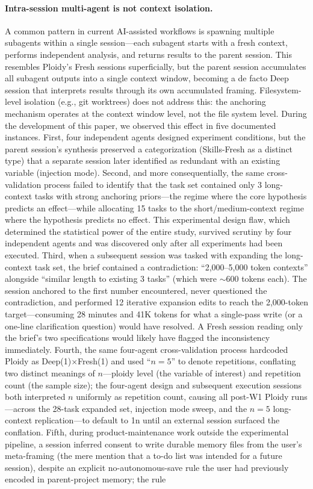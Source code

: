 \documentclass[11pt]{article}
\begin{document}
\paragraph{Intra-session multi-agent is not context isolation.}
A common pattern in current AI-assisted workflows is spawning multiple subagents within a single session---each subagent starts with a fresh context, performs independent analysis, and returns results to the parent session. This resembles Ploidy's Fresh sessions superficially, but the parent session accumulates all subagent outputs into a single context window, becoming a de facto Deep session that interprets results through its own accumulated framing. Filesystem-level isolation (e.g., git worktrees) does not address this: the anchoring mechanism operates at the context window level, not the file system level. During the development of this paper, we observed this effect in five documented instances. First, four independent agents designed experiment conditions, but the parent session's synthesis preserved a categorization (Skills-Fresh as a distinct type) that a separate session later identified as redundant with an existing variable (injection mode). Second, and more consequentially, the same cross-validation process failed to identify that the task set contained only 3 long-context tasks with strong anchoring priors---the regime where the core hypothesis predicts an effect---while allocating 15 tasks to the short/medium-context regime where the hypothesis predicts no effect. This experimental design flaw, which determined the statistical power of the entire study, survived scrutiny by four independent agents and was discovered only after all experiments had been executed. Third, when a subsequent session was tasked with expanding the long-context task set, the brief contained a contradiction: ``2,000--5,000 token contexts'' alongside ``similar length to existing 3 tasks'' (which were $\sim$600 tokens each). The session anchored to the first number encountered, never questioned the contradiction, and performed 12 iterative expansion edits to reach the 2,000-token target---consuming 28 minutes and 41K tokens for what a single-pass write (or a one-line clarification question) would have resolved. A Fresh session reading only the brief's two specifications would likely have flagged the inconsistency immediately. Fourth, the same four-agent cross-validation process hardcoded Ploidy as Deep(1)$\times$Fresh(1) and used ``$n{=}5$'' to denote repetitions, conflating two distinct meanings of $n$---ploidy level (the variable of interest) and repetition count (the sample size); the four-agent design and subsequent execution sessions both interpreted $n$ uniformly as repetition count, causing all post-W1 Ploidy runs---across the 28-task expanded set, injection mode sweep, and the $n{=}5$ long-context replication---to default to 1n until an external session surfaced the conflation. Fifth, during product-maintenance work outside the experimental pipeline, a session inferred consent to write durable memory files from the user's meta-framing (the mere mention that a to-do list was intended for a future session), despite an explicit no-autonomous-save rule the user had previously encoded in parent-project memory; the rule 
\end{document}
